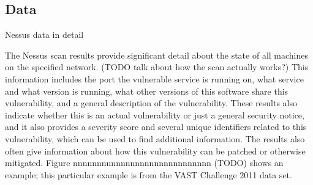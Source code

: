 \documentclass{acm_proc_article-sp}
\begin{document}
\subsection{Data}
Nessus data in detail

The Nessus scan results provide significant detail about the state of all machines on the specified network.
(TODO talk about how the scan actually works?) This information includes the port the vulnerable service is running on, what service and what version is running, what other versions of this software share this vulnerability, and a general description of the vulnerability.
These results also indicate whether this is an actual vulnerability or just a general security notice, and it also provides a severity score and several unique identifiers related to this vulnerability, which can be used to find additional information.
The results also often give information about how this vulnerability can be patched or otherwise mitigated.
Figure nnnnnnnnnnnnnnnnnnnnnnnnnnnnn (TODO) shows an example; this particular example is from the VAST Challenge 2011 data set.



\end{document}
